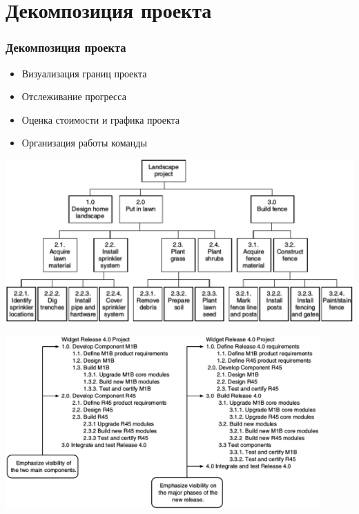 \documentclass{../../slides-style}
\begin{document}
    \section{Декомпозиция проекта}

    \begin{frame}
        \frametitle{Декомпозиция проекта}
        \begin{itemize}
            \item Визуализация границ проекта
            \item Отслеживание прогресса
            \item Оценка стоимости и графика проекта
            \item Организация работы команды
        \end{itemize}
    \end{frame}

    \begin{frame}
        \begin{center}
            \includegraphics[width=\textwidth]{wbsExample.png}
        \end{center}
    \end{frame}

    \begin{frame}
        \begin{center}
            \includegraphics[width=0.9\textwidth]{wbsExample2.png}
        \end{center}
    \end{frame}
\end{document}
